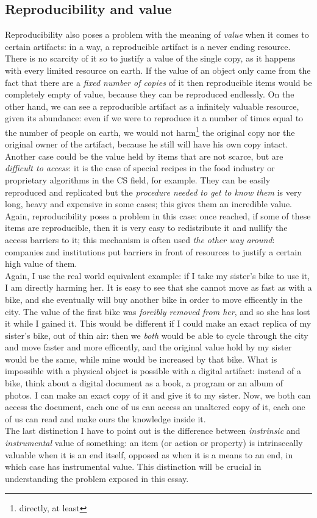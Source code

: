 \documentclass{article}
\begin{document}
		\subsection{Reproducibility and value}
			Reproducibility also poses a problem with the meaning of \textit{value} when it comes to certain artifacts: in a way, a reproducible artifact is a never ending resource. There is no scarcity of it so to justify a value of the single copy,\label{RaV} as it happens with every limited resource on earth. If the value of an object only came from the fact that there are a \textit{fixed number of copies} of it then reproducible items would be completely empty of value, because they can be reproduced endlessly. On the other hand, we can see a reproducible artifact as a infinitely valuable resource, given its abundance: even if we were to reproduce it a number of times equal to the number of people on earth, we would not harm\footnote{directly, at least} the original copy nor the original owner of the artifact, because he still will have his own copy intact. Another case could be the value held by items that are not scarce, but are \textit{difficult to access}: it is the case of special recipes in the food industry or proprietary algorithms in the CS field, for example. They can be easily reproduced and replicated but the \textit{procedure needed to get to know them} is very long, heavy and expensive in some cases; this gives them an incredible value. Again, reproducibility poses a problem in this case: once reached, if some of these items are reproducible, then it is very easy to redistribute it and nullify the access barriers to it; this mechanism is often used \textit{the other way around}: companies and institutions put barriers in front of resources to justify a certain high value of them.\\
			Again, I use the real world equivalent example: if I take my sister's bike to use it, I am directly harming her. It is easy to see that she cannot move as fast as with a bike, and she eventually will buy another bike in order to move efficently in the city. The value of the first bike was \textit{forcibly removed from her}, and so she has lost it while I gained it. This would be different if I could make an exact replica of my sister's bike, out of thin air: then we \textit{both} would be able to cycle through the city and move faster and more efficently, and the original value hold by my sister would be the same, while mine would be increased by that bike. What is impossible with a physical object is possible with a digital artifact: instead of a bike, think about a digital document as a book, a program or an album of photos. I can make an exact copy of it and give it to my sister. Now, we both can access the document, each one of us can access an unaltered copy of it, each one of us can read and make ours the knowledge inside it.\\
			The last distinction I have to point out is the difference between \textit{instrinsic} and \textit{instrumental} value of something: an item (or action or property) is intrinsecally valuable when it is an end itself, opposed as when it is a means to an end, in which case has instrumental value\cite{valuetheory}. This distinction will be crucial in understanding the problem exposed in this essay.
\end{document}
